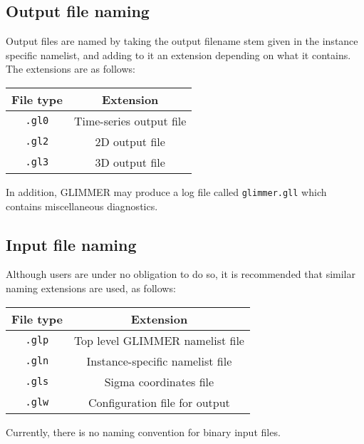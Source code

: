 \documentclass[11pt]{article}
\begin{document}
\subsection{Output file naming}
%
Output files are named by taking the output filename stem given in the
instance specific namelist, and adding to it an extension depending on what it
contains. The extensions are as follows:
%
\begin{center}
\begin{tabular}{|c|c|}
\hline
File type & Extension \\
\hline
\hline
\texttt{.gl0} & Time-series output file \\
\hline
\texttt{.gl2} & 2D output file \\
\hline
\texttt{.gl3} & 3D output file \\
\hline
\end{tabular}
\end{center}
%
In addition, GLIMMER may produce a log file called \texttt{glimmer.gll} which
contains miscellaneous diagnostics.
%
\subsection{Input file naming}
%
Although users are under no obligation to do so, it is recommended that
similar naming extensions are used, as follows:
%
\begin{center}
\begin{tabular}{|c|c|}
\hline
File type & Extension \\
\hline
\hline
\texttt{.glp} & Top level GLIMMER namelist file \\
\hline
\texttt{.gln} & Instance-specific namelist file \\
\hline
\texttt{.gls} & Sigma coordinates file \\
\hline
\texttt{.glw} & Configuration file for output \\
\hline
\end{tabular}
\end{center}
%
Currently, there is no naming convention for binary input files.
%
\end{document}
